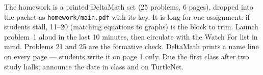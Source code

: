 \documentclass[10pt]{article}
\begin{document}
\begin{teachernote}[Homework]
The homework is a printed DeltaMath set (25 problems, 6 pages), dropped into the packet as
\texttt{homework/main.pdf} with its key. It is long for one assignment: if students stall, 11--20
(matching equations to graphs) is the block to trim. Launch problem~1 aloud in the last 10
minutes, then circulate with the Watch For list in mind. Problems 21 and 25 are the formative
check. DeltaMath prints a name line on every page --- students write it on page 1 only. Due the first class after two study halls; announce the date in class and on
TurtleNet.
\end{teachernote}
\end{document}
